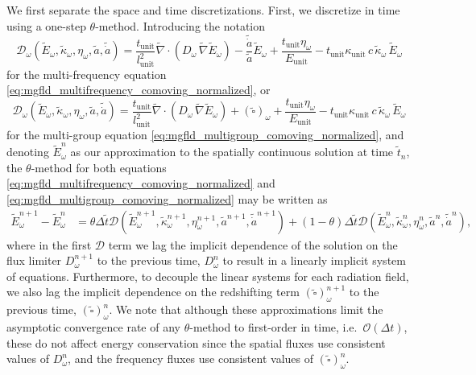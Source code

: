 \documentclass[10pt]{article}
\renewcommand{\(}{\left(}
\renewcommand{\)}{\right)}
\newcommand{\adot}{\dot{a}}
\newcommand{\dt}{\Delta t}
\newcommand{\mD}{{\mathcal D}}
\newcommand{\Lunit}{l_{\text{unit}}}
\newcommand{\Tunit}{t_{\text{unit}}}
\newcommand{\Eunit}{E_{\text{unit}}}
\newcommand{\Kunit}{\kappa_{\text{unit}}}
\newcommand{\tK}{\tilde{\kappa}}
\newcommand{\tT}{\tilde{t}}
\newcommand{\tE}{\tilde{E}}
\newcommand{\tA}{\tilde{a}}
\newcommand{\tAdot}{\tilde{\adot}}
\newcommand{\tnabla}{\tilde{\nabla}}
\begin{document}
We first separate the space and time discretizations.  First, we
discretize in time using a one-step $\theta$-method.  Introducing the
notation 
\[
   \mD_{\omega}(\tE_{\omega},\tK_{\omega},\eta_{\omega},\tA,\tAdot) = 
   \frac{\Tunit}{\Lunit^2}\tnabla\cdot\(D_{\omega}\,\tnabla \tE_{\omega}\)
    - \frac{\tAdot}{\tA}\tE_{\omega} + \frac{\Tunit\eta_{\omega}}{\Eunit}
    - \Tunit \Kunit\, c\, \tK_{\omega}\, \tE_{\omega}
\]
for the multi-frequency equation
\eqref{eq:mgfld_multifrequency_comoving_normalized}, or 
\[
   \mD_{\omega}(\tE_{\omega},\tK_{\omega},\eta_{\omega},\tA,\tAdot) = 
   \frac{\Tunit}{\Lunit^2}\tnabla\cdot\(D_{\omega}\,\tnabla \tE_{\omega}\)
    + (\tilde{\square})_{\omega}
    + \frac{\Tunit\eta_{\omega}}{\Eunit} 
    - \Tunit \Kunit\, c\, \tK_{\omega}\, \tE_{\omega}
\]
for the multi-group equation \eqref{eq:mgfld_multigroup_comoving_normalized},
and denoting $\tE_{\omega}^n$ as our approximation to the spatially continuous
solution at time $\tT_{n}$, the $\theta$-method for both equations
\eqref{eq:mgfld_multifrequency_comoving_normalized} and
\eqref{eq:mgfld_multigroup_comoving_normalized} may be written as
\begin{align}
  \label{eq:mgfld_theta}
  \tE_{\omega}^{n+1} - \tE_{\omega}^n &= 
    \theta\Delta \tT \mD(\tE_{\omega}^{n+1},\tK_{\omega}^{n+1},\eta_{\omega}^{n+1},\tA^{n+1},\tAdot^{n+1}) 
    + (1-\theta)\Delta \tT \mD(\tE_{\omega}^n,\tK_{\omega}^n,\eta_{\omega}^n,\tA^n,\tAdot^n),
\end{align}
where in the first $\mD$ term we lag the implicit dependence of the
solution on the flux limiter $D_{\omega}^{n+1}$ to the previous time, $D_{\omega}^n$ to
result in a linearly implicit system of equations.  Furthermore, to
decouple the linear systems for each radiation field, we also lag
the implicit dependence on the redshifting term
$(\tilde{\square})_{\omega}^{n+1}$ to the previous time,
$(\tilde{\square})_{\omega}^{n}$.  We note that although these
approximations limit the asymptotic convergence rate of any
$\theta$-method to first-order in time, i.e.~$\mathcal O(\dt)$, these
do not affect energy conservation since the spatial fluxes use
consistent values of $D_{\omega}^n$, and the frequency fluxes use
consistent values of $(\tilde{\square})_{\omega}^{n}$.
\end{document}
